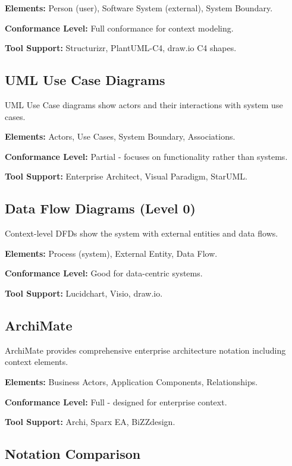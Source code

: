 \documentclass[11pt,letterpaper]{article}
\begin{document}
\textbf{Elements:} Person (user), Software System (external), System Boundary.

\textbf{Conformance Level:} Full conformance for context modeling.

\textbf{Tool Support:} Structurizr, PlantUML-C4, draw.io C4 shapes.

\subsection{UML Use Case Diagrams}

UML Use Case diagrams show actors and their interactions with system use cases.

\textbf{Elements:} Actors, Use Cases, System Boundary, Associations.

\textbf{Conformance Level:} Partial - focuses on functionality rather than systems.

\textbf{Tool Support:} Enterprise Architect, Visual Paradigm, StarUML.

\subsection{Data Flow Diagrams (Level 0)}

Context-level DFDs show the system with external entities and data flows.

\textbf{Elements:} Process (system), External Entity, Data Flow.

\textbf{Conformance Level:} Good for data-centric systems.

\textbf{Tool Support:} Lucidchart, Visio, draw.io.

\subsection{ArchiMate}

ArchiMate provides comprehensive enterprise architecture notation including context elements.

\textbf{Elements:} Business Actors, Application Components, Relationships.

\textbf{Conformance Level:} Full - designed for enterprise context.

\textbf{Tool Support:} Archi, Sparx EA, BiZZdesign.

\subsection{Notation Comparison}
\end{document}
